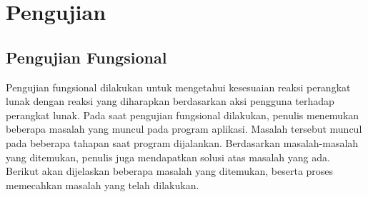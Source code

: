 \section{Pengujian}

\subsection{Pengujian Fungsional}
\label{subsec:fungsional}

Pengujian fungsional dilakukan untuk mengetahui kesesuaian reaksi perangkat lunak dengan reaksi yang diharapkan berdasarkan aksi pengguna terhadap perangkat lunak. Pada saat pengujian fungsional dilakukan, penulis menemukan beberapa masalah yang muncul pada program aplikasi. Masalah tersebut muncul pada beberapa tahapan saat program dijalankan. Berdasarkan masalah-masalah yang ditemukan, penulis juga mendapatkan solusi atas masalah yang ada. Berikut akan dijelaskan beberapa masalah yang ditemukan, beserta proses memecahkan masalah yang telah dilakukan.

